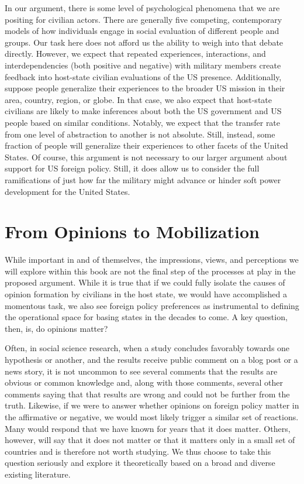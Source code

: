 In our argument, there is some level of psychological phenomena that we are positing for civilian actors. There are generally five competing, contemporary models of how individuals engage in social evaluation of different people and groups. Our task here does not afford us the ability to weigh into that debate directly.\autocite{abele2021} However, we expect that repeated experiences, interactions, and interdependencies (both positive and negative) with military members create feedback into host-state civilian evaluations of the US presence. Additionally, suppose people generalize their experiences to the broader US mission in their area, country, region, or globe. In that case, we also expect that host-state civilians are likely to make inferences about both the US government and US people based on similar conditions. Notably, we expect that the transfer rate from one level of abstraction to another is not absolute. Still, instead, some fraction of people will generalize their experiences to other facets of the United States. Of course, this argument is not necessary to our larger argument about support for US foreign policy. Still, it does allow us to consider the full ramifications of just how far the military might advance or hinder soft power development for the United States.


\section*{From Opinions to Mobilization}

While important in and of themselves, the impressions, views, and perceptions we will explore within this book are not the final step of the processes at play in the proposed argument. While it is true that if we could fully isolate the causes of opinion formation by civilians in the host state, we would have accomplished a momentous task, we also see foreign policy preferences as instrumental to defining the operational space for basing states in the decades to come. A key question, then, is, do opinions matter? 

Often, in social science research, when a study concludes favorably towards one hypothesis or another, and the results receive public comment on a blog post or a news story, it is not uncommon to see several comments that the results are obvious or common knowledge and, along with those comments, several other comments saying that that results are wrong and could not be further from the truth. Likewise, if we were to answer whether opinions on foreign policy matter in the affirmative or negative, we would most likely trigger a similar set of reactions. Many would respond that we have known for years that it does matter. Others, however, will say that it does not matter or that it matters only in a small set of countries and is therefore not worth studying. We thus choose to take this question seriously and explore it theoretically based on a broad and diverse existing literature.

